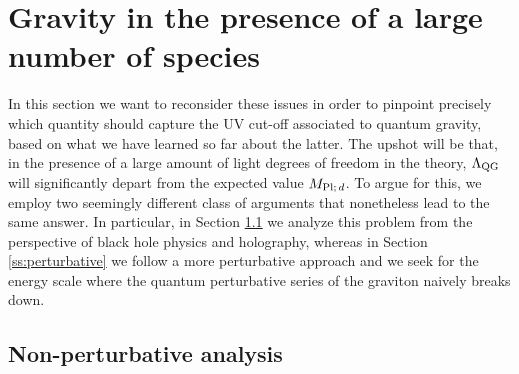 \section{Gravity in the presence of a large number of species}
\label{s:speciesmotivation}

In this section we want to reconsider these issues in order to pinpoint precisely which quantity should capture the UV cut-off associated to quantum gravity, based on what we have learned so far about the latter. The upshot will be that, in the presence of a large amount of light degrees of freedom in the theory, $\Lambda_{\text{QG}}$ will significantly depart from the expected value $M_{\text{Pl;}\, d}$. To argue for this, we employ two seemingly different class of arguments that nonetheless lead to the same answer. In particular, in Section \ref{ss:nonperturbative} we analyze this problem from the perspective of black hole physics and holography, whereas in Section \ref{ss:perturbative} we follow a more perturbative approach and we seek for the energy scale where the quantum perturbative series of the graviton naively breaks down.

\subsection{Non-perturbative analysis}
\label{ss:nonperturbative}

